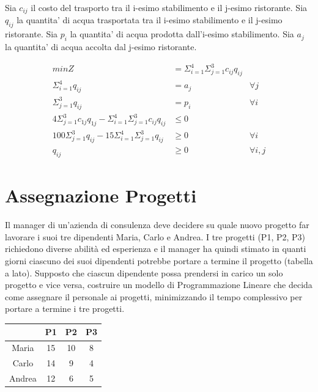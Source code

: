 Sia $c_{ij}$ il costo del trasporto tra il i-esimo stabilimento e il j-esimo ristorante.
Sia $q_{ij}$ la quantita' di acqua trasportata tra il i-esimo stabilimento e il j-esimo ristorante.
Sia $p_i$ la quantita' di acqua prodotta dall'i-esimo stabilimento.
Sia $a_j$ la quantita' di acqua accolta dal j-esimo ristorante.

\begin{align*}
    min Z &= \Sigma ^{4} _{i=1} \Sigma ^{3} _{j=1} c_{ij} q_{ij} \\
    \Sigma ^{4} _{i=1} q_{ij} &= a_j &\forall j\\
    \Sigma ^{3} _{j=1} q_{ij} &= p_i &\forall i\\
    4 \Sigma ^{3} _{j=1} c_{1j} q_{1j} - \Sigma ^{4} _{i=1} \Sigma ^{3} _{j=1} c_{ij} q_{ij} &\leq 0\\
    100 \Sigma ^{3} _{j=1} q_{ij} - 15 \Sigma ^{4} _{i=1} \Sigma ^{3} _{j=1} q_{ij} &\geq 0 &\forall i\\
    q_{ij} &\geq 0 &\forall i,j 
\end{align*}

\section{Assegnazione Progetti}

Il manager di un’azienda di consulenza deve decidere su quale nuovo progetto far lavorare i suoi tre dipendenti Maria, Carlo e Andrea. I tre progetti (P1, P2, P3) richiedono diverse abilità ed esperienza e il manager ha quindi stimato in quanti giorni ciascuno dei suoi dipendenti potrebbe portare a termine il progetto (tabella a lato). Supposto che ciascun dipendente possa prendersi in carico un solo progetto e vice versa, costruire un modello di Programmazione Lineare che decida come assegnare il personale ai progetti, minimizzando il tempo complessivo per portare a termine i tre progetti.

\begin{center}
    \begin{tabular}{||c | c | c | c||}
        \hline
        & P1 & P2 & P3 \\
        \hline
        Maria & 15 & 10 & 8 \\
        \hline
        Carlo & 14 & 9 & 4 \\
        \hline
        Andrea & 12 & 6 & 5 \\
        \hline
    \end{tabular}
\end{center}


